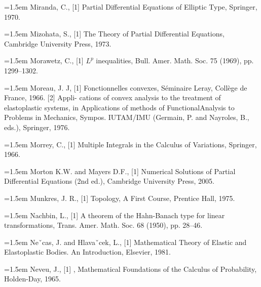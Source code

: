 \noindent\hangindent=1.5em Miranda, C., \hypertarget{ref:Miranda-1}{[1]} Partial Differential Equations of Elliptic Type, Springer, 1970.\par{}
\noindent\hangindent=1.5em Mizohata, S., \hypertarget{ref:Mizohata-1}{[1]} The Theory of Partial Differential Equations, Cambridge University Press, 1973.\par{}
\noindent\hangindent=1.5em Morawetz, C., \hypertarget{ref:Morawetz-1}{[1]} $L^p$ inequalities, Bull. Amer. Math. Soc. 75 (1969), pp. 1299--1302.\par{}
\noindent\hangindent=1.5em Moreau, J. J, \hypertarget{ref:Moreau-1}{[1]} Fonctionnelles convexes, Séminaire Leray, Collège de France, 1966. \hypertarget{ref:Moreau-2}{[2]} Appli- cations of convex analysis to the treatment of elastoplastic systems, in Applications of methods of FunctionalAnalysis to Problems in Mechanics, Sympos. IUTAM/IMU (Germain, P. and Nayroles, B., eds.), Springer, 1976.\par{}
\noindent\hangindent=1.5em Morrey, C., \hypertarget{ref:Morrey-1}{[1]} Multiple Integrals in the Calculus of Variations, Springer, 1966.\par{}
\noindent\hangindent=1.5em Morton K.W. and Mayers D.F., \hypertarget{ref:MortonMayers-1}{[1]} Numerical Solutions of Partial Differential Equations (2nd ed.), Cambridge University Press, 2005.\par{}
\noindent\hangindent=1.5em Munkres, J. R., \hypertarget{ref:Munkres-1}{[1]} Topology, A First Course, Prentice Hall, 1975.\par{}
\noindent\hangindent=1.5em Nachbin, L., \hypertarget{ref:Nachbin-1}{[1]} A theorem of the Hahn-Banach type for linear transformations, Trans. Amer. Math. Soc. 68 (1950), pp. 28--46.\par{}
\noindent\hangindent=1.5em Neˇcas, J. and Hlavaˇcek, L., \hypertarget{ref:NecasHlavacek-1}{[1]} Mathematical Theory of Elastic and Elastoplastic Bodies. An Introduction, Elsevier, 1981.\par{}
\noindent\hangindent=1.5em Neveu, J., \hypertarget{ref:Neveu-1}{[1]} , Mathematical Foundations of the Calculus of Probability, Holden-Day, 1965.\par{}
